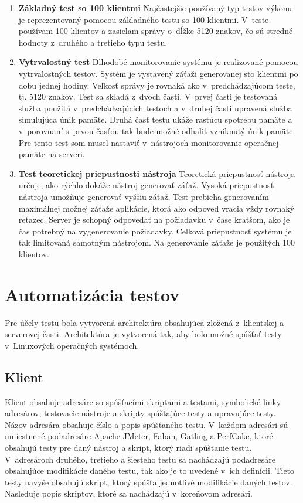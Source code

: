 \documentclass[12pt,oneside,final]{fithesis-utf8}
\begin{document}
\begin{enumerate}
\item \textbf{Základný test so 100 klientmi}
\newline
Najčastejšie používaný typ testov výkonu je reprezentovaný pomocou základného testu so 100 klientmi. V~teste používam 100 klientov a zasielam správy o~dĺžke 5120 znakov, čo sú stredné hodnoty z~druhého a tretieho typu testu.
\newline

\item \textbf{Vytrvalostný test}
\newline
Dlhodobé monitorovanie systému je realizované pomocou vytrvalostných testov. Systém je vystavený záťaži generovanej sto klientmi po dobu jednej hodiny. Veľkosť správy je rovnaká ako v~predchádzajúcom teste, tj. 5120 znakov. Test sa skladá z~dvoch častí. V~prvej časti je testovaná služba použitá v~predchádzajúcich testoch a v~druhej časti upravená služba simulujúca únik pamäte. Druhá časť testu ukáže rastúcu spotrebu pamäte a v~porovnaní s~prvou časťou tak bude možné odhaliť vzniknutý únik pamäte. Pre tento test som musel nastaviť v~nástrojoch monitorovanie operačnej pamäte na serveri.
\newline

\item \textbf{Test teoretickej priepustnosti nástroja}
\newline
Teoretická priepustnosť nástroja určuje, ako rýchlo dokáže nástroj generovať záťaž. Vysoká priepustnosť nástroja umožňuje generovať vyššiu záťaž. Test prebieha generovaním maximálnej možnej záťaže aplikácie, ktorá ako odpoveď vracia vždy rovnaký reťazec. Server je schopný odpovedať na požiadavku v~čase kratšom, ako je čas potrebný na vygenerovanie požiadavky. Celková priepustnosť systému je tak limitovaná samotným nástrojom. Na generovanie záťaže je použitých 100 klientov.

\end{enumerate}

\newpage
\section{Automatizácia testov}
Pre účely testu bola vytvorená architektúra obsahujúca zložená z~klientskej a serverovej časti. Architektúra je vytvorená tak, aby bolo možné spúšťať testy v~Linuxových operačných systémoch.

\subsection{Klient}
Klient obsahuje adresáre so spúšťacími skriptami a testami, symbolické linky adresárov, testovacie nástroje a skripty spúšťajúce testy a upravujúce testy. Názov adresára obsahuje číslo a popis spúšťaného testu. V~každom adresári sú umiestnené podadresáre Apache JMeter, Faban, Gatling a PerfCake, ktoré obsahujú testy pre daný nástroj a skript, ktorý riadi spúštanie testu. V~adresároch druhého, tretieho a šiesteho testu sa nachádzajú podadresáre obsahujúce modifikácie daného testu, tak ako je to uvedené v~ich definícii. Tieto testy navyše obsahujú skript, ktorý spúšťa jednotlivé modifikácie daných testov. Nasleduje popis skriptov, ktoré sa nachádzajú v~koreňovom adresári.	
\end{document}
